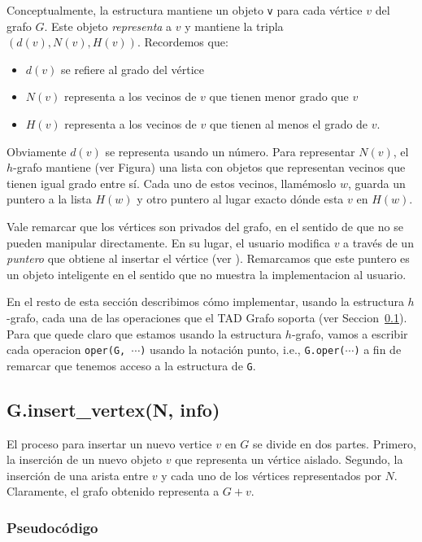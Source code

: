 \documentclass[a4paper,12pt]{article}
\begin{document}
Conceptualmente, la estructura mantiene un objeto \texttt{v} para cada vértice $v$ del grafo $G$.  Este objeto \emph{representa} a $v$ y mantiene la tripla $(d(v), N(v), H(v))$.  Recordemos que:   
\begin{itemize}
\item $d(v)$ se refiere al grado del vértice
\item $N(v)$ representa a los vecinos de $v$ que tienen menor grado que $v$
\item $H(v)$ representa a los vecinos de $v$ que tienen al menos el grado de $v$.
\end{itemize}

 Obviamente $d(v)$ se representa usando un número. Para representar $N(v)$, el $h$-grafo mantiene (ver Figura) una lista con objetos que representan vecinos que tienen igual grado entre sí. Cada uno de estos vecinos,   llamémoslo $w$,  guarda un puntero a la lista $H(w)$ y otro puntero al lugar exacto dónde esta $v$ en $H(w)$.

Vale remarcar que los vértices son privados del grafo, en el sentido de que no se pueden manipular directamente.  En su lugar, el usuario modifica $v$ a través de un \emph{puntero} que obtiene al insertar el vértice (ver ).  Remarcamos que este puntero es un objeto inteligente en el sentido que no muestra la implementacion al usuario.

En el resto de esta sección describimos cómo implementar, usando la estructura $h$-grafo, cada una de las operaciones que el TAD Grafo soporta (ver Seccion~\ref{}).  Para que quede claro que estamos usando la estructura $h$-grafo, vamos a escribir cada operacion \texttt{oper(G, $\cdots$)} usando la notación punto, i.e., \texttt{G.oper($\cdots$)} a fin de remarcar que tenemos acceso a la estructura de \texttt{G}.


\subsection{G.insert\_vertex(N, info)}

El proceso para insertar un nuevo vertice $v$ en $G$ se divide en dos partes.  Primero, la inserción de un nuevo objeto $v$ que representa un vértice aislado.  Segundo, la inserción de una arista entre $v$ y cada uno de los vértices representados por $N$.  Claramente, el grafo obtenido representa a $G + v$.

\subsubsection*{Pseudocódigo}
\end{document}
